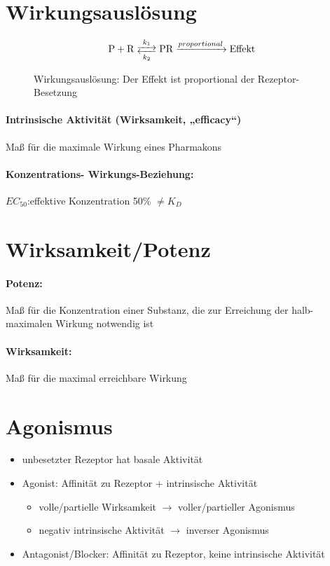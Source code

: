 \documentclass[10pt,a4paper]{report}
\newenvironment{reaction}{\begin{equation}}{\end{equation}}
\begin{document}
\section{Wirkungsauslösung}
\begin{figure}
\begin{reaction}
	\ce{P + R <-->[{k_1}][{k_2}] PR ->[{proportional}] Effekt}
\end{reaction}
\caption{Wirkungsauslösung: Der Effekt ist proportional der Rezeptor-Besetzung}
\end{figure}

\paragraph{Intrinsische Aktivität 
(Wirksamkeit, „efficacy“)}Maß für die maximale Wirkung 
eines Pharmakons
\paragraph{Konzentrations-
Wirkungs-Beziehung:}$EC_{50}$:effektive Konzentration 50\% $\neq K_D$
\section{Wirksamkeit/Potenz}
\paragraph{Potenz:}Maß für die 
Konzentration einer Substanz, 
die zur Erreichung der halb-
maximalen Wirkung 
notwendig ist
\paragraph{Wirksamkeit:}Maß für 
die maximal erreichbare 
Wirkung
\section{Agonismus}
\begin{itemize}
 \item unbesetzter Rezeptor hat basale Aktivität
	\item Agonist: Affinität zu Rezeptor + intrinsische Aktivität 
		\begin{itemize}
		\item	volle/partielle Wirksamkeit $\rightarrow$ voller/partieller Agonismus
		\item negativ intrinsische Aktivität $\rightarrow$ inverser Agonismus
		\end{itemize}	
	\item Antagonist/Blocker: Affinität zu Rezeptor, keine intrinsische Aktivität	
\end{itemize}
\end{document}
